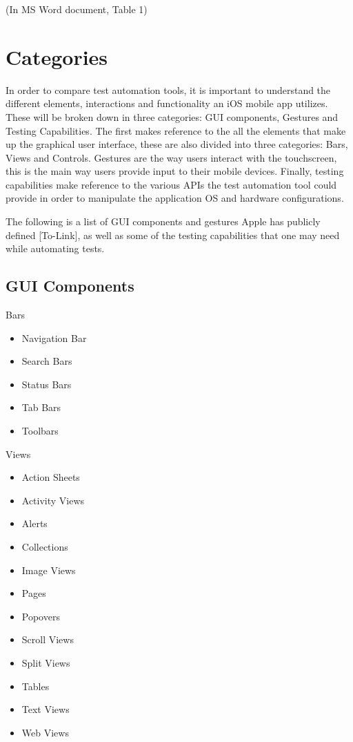 (In MS Word document, Table 1)

\section{Categories}
In order to compare test automation tools, it is important to understand the different elements, interactions and functionality an iOS mobile app utilizes. These will be broken down in three categories: GUI components, Gestures and Testing Capabilities. The first makes reference to the all the elements that make up the graphical user interface, these are also divided into three categories: Bars, Views and Controls. Gestures are the way users interact with the touchscreen, this is the main way users provide input to their mobile devices. Finally, testing capabilities make reference to the various APIs the test automation tool could provide in order to manipulate the application OS and hardware configurations.

The following is a list of GUI components and gestures Apple has publicly defined [To-Link], as well as some of the testing capabilities that one may need while automating tests. 

\subsection {GUI Components}
	
	Bars
	\begin{itemize}
  		\item Navigation Bar
  		\item Search Bars
		\item Status Bars
		\item Tab Bars
		\item Toolbars
	\end{itemize}

	Views
	\begin{itemize}
  		\item Action Sheets
		\item Activity Views
		\item Alerts
		\item Collections
		\item Image Views
		\item Pages
		\item Popovers
		\item Scroll Views
		\item Split Views
		\item Tables
		\item Text Views
		\item Web Views
	\end{itemize}
	
